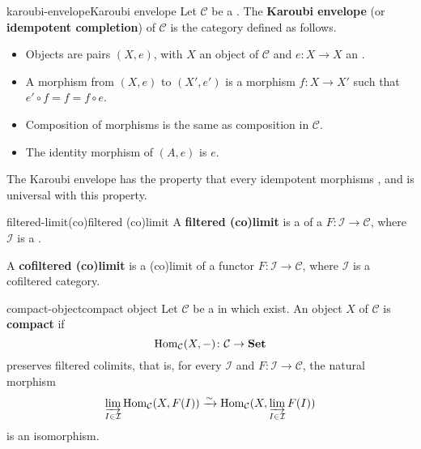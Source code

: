 \begin{topic}{karoubi-envelope}{Karoubi envelope}
    Let $\mathcal{C}$ be a . The \textbf{Karoubi envelope} (or \textbf{idempotent completion}) of $\mathcal{C}$ is the category defined as follows.
    \begin{itemize}
        \item Objects are pairs $(X, e)$, with $X$ an object of $\mathcal{C}$ and $e \colon X \to X$ an .
        \item A morphism from $(X, e)$ to $(X', e')$ is a morphism $f \colon X \to X'$ such that $e' \circ f = f = f \circ e$.
        \item Composition of morphisms is the same as composition in $\mathcal{C}$.
        \item The identity morphism of $(A, e)$ is $e$.
    \end{itemize}
    The Karoubi envelope has the property that every idempotent morphisms , and is universal with this property.
\end{topic}

\begin{topic}{filtered-limit}{(co)filtered (co)limit}
    A \textbf{filtered (co)limit} is a  of a  $F \colon \mathcal{I} \to \mathcal{C}$, where $\mathcal{I}$ is a .
    
    A \textbf{cofiltered (co)limit} is a (co)limit of a functor $F \colon \mathcal{I} \to \mathcal{C}$, where $\mathcal{I}$ is a cofiltered category.
\end{topic}

\begin{topic}{compact-object}{compact object}
    Let $\mathcal{C}$ be a   in which  exist. An object $X$ of $\mathcal{C}$ is \textbf{compact} if
    \[ \operatorname{Hom}_\mathcal{C}(X, -) \colon \mathcal{C} \to \textbf{Set} \]
    preserves filtered colimits, that is, for every  $\mathcal{I}$ and  $F \colon \mathcal{I} \to \mathcal{C}$, the natural morphism
    \[ \varinjlim_{I \in \mathcal{I}} \operatorname{Hom}_\mathcal{C}(X, F(I)) \xrightarrow{\sim} \operatorname{Hom}_\mathcal{C}(X, \varinjlim_{I \in \mathcal{I}} F(I)) \]
    is an isomorphism.
\end{topic}

